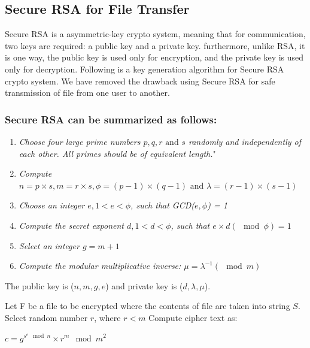 \documentclass[12pt,journal,compsoc]{IEEEtran}
\begin{document}
\subsection{{Secure RSA for File Transfer}}
\label{sec:secureMrea}

Secure RSA\cite{mrea} is a asymmetric-key crypto system, meaning that for communication, two keys are required: a public key and a private key. furthermore, unlike RSA, it is one way, the public key is used only for encryption, and the private key is used only for decryption. Following is a key generation algorithm for Secure RSA crypto system. We have removed the drawback using Secure RSA for safe transmission of file from one user to another.

\subsubsection{\bf Secure RSA can be summarized as follows:}
\label{sec:mrea_algo}
\begin{enumerate}[ {STEP }1{:} ]
	\item \emph{Choose four large prime numbers $p, q, r \text{ and } s$ randomly and independently of each other. All primes should be of equivalent length.}"
	\item \emph{Compute $n = p \times s, m=r \times s, \phi = (p-1)\times(q-1) \text{ and } \lambda = (r-1) \times (s-1)$}
	\item \emph{Choose an integer $e, 1 < e < \phi$, such that GCD($e, \phi$) = 1}
		\label{itm:step3}
	\item \emph{Compute the secret exponent $d, 1 < d < \phi$, such that $e \times d (\mod \phi) = 1$}
		\label{itm:step6}
	\item \emph{Select an integer $g = m+1$}
	\item \emph{Compute the modular multiplicative inverse: $\mu = \lambda^{-1} (\mod m)$}
\end{enumerate}
The public key is ($n, m, g, e$) and private key is ($d, \lambda, \mu$). 

Let F be a file to be encrypted where the contents of file are taken into string $S$. Select random number $r$, where $r<m$ Compute cipher text as:
\begin{center}
	$c = g^{s^{e}\mod n} \times r^{m}\mod m^{2}$
\end{center}
\end{document}
